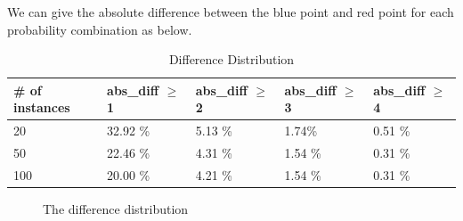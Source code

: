 


We can give the absolute difference between the blue point and red point for each probability combination as below.

\begin{table}[ht]
  \centering
  \caption{Difference Distribution}
  \begin{tabular}{|l|l|l|l|l|}
  \hline
  \# of instances & abs\_diff $\geq$ 1 & abs\_diff $\geq$ 2 & abs\_diff $\geq$ 3 & abs\_diff $\geq$ 4 \\
  \hline
  20 & 32.92 \% & 5.13 \% & 1.74\% & 0.51 \% \\
  50 & 22.46 \% & 4.31 \% & 1.54 \% & 0.31 \%  \\
  100 & 20.00 \% & 4.21 \% & 1.54 \% & 0.31 \% \\
  \hline
  \end{tabular}
\end{table}


\begin{figure}[ht]
  \centering
  \caption{The difference distribution}
  \label{Fig}
\end{figure}

